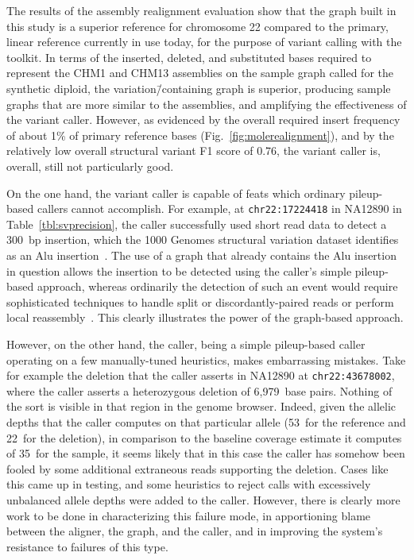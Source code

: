 The results of the assembly realignment evaluation show that the graph built in this study is a superior reference for chromosome 22 compared to the primary, linear reference currently in use today, for the purpose of variant calling with the \vg toolkit. In terms of the inserted, deleted, and substituted bases required to represent the CHM1 and CHM13 assemblies on the sample graph called for the synthetic diploid, the variation\=/containing graph is superior, producing sample graphs that are more similar to the assemblies, and amplifying the effectiveness of the variant caller. However, as evidenced by the overall required insert frequency of about 1\% of primary reference bases (Fig.~\ref{fig:molerealignment}), and by the relatively low overall structural variant F1 score of 0.76, the \vg variant caller is, overall, still not particularly good.

On the one hand, the \vg variant caller is capable of feats which ordinary pileup-based callers cannot accomplish. For example, at \texttt{chr22:17224418} in NA12890 in Table~\ref{tbl:svprecision}, the \vg caller successfully used short read data to detect a 300~bp insertion, which the 1000 Genomes structural variation dataset identifies as an Alu insertion~\cite{sudmant2015integrated}. The use of a graph that already contains the Alu insertion in question allows the insertion to be detected using the \vg caller's simple pileup-based approach, whereas ordinarily the detection of such an event would require sophisticated techniques to handle split or discordantly-paired reads or perform local reassembly~\cite{wildschutte2015discovery}. This clearly illustrates the power of the graph-based approach.



However, on the other hand, the \vg caller, being a simple pileup-based caller operating on a few manually-tuned heuristics, makes embarrassing mistakes. Take for example the deletion that the caller asserts in NA12890 at \texttt{chr22:43678002}, where the caller asserts a heterozygous deletion of 6,979~base pairs. Nothing of the sort is visible in that region in the genome browser. Indeed, given the allelic depths that the caller computes on that particular allele (53~for the reference and 22~for the deletion), in comparison to the baseline coverage estimate it computes of 35~for the sample, it seems likely that in this case the caller has somehow been fooled by some additional extraneous reads supporting the deletion. Cases like this came up in testing, and some heuristics to reject calls with excessively unbalanced allele depths were added to the caller. However, there is clearly more work to be done in characterizing this failure mode, in apportioning blame between the aligner, the graph, and the caller, and in improving the system's resistance to failures of this type.

